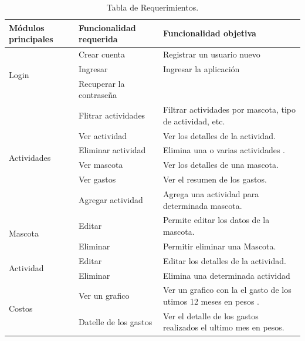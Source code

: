 \documentclass[letterpaper,12pt,openany,oneside]{book}
\begin{document}
\begin{table}[htb]
\begin{center}
\begin{tabular}{|l|l|p{5cm}|} 

\hline
Módulos principales & Funcionalidad
requerida & Funcionalidad objetiva \\
\hline \hline  \hline 
\multirow{3}{2cm}{Login} 
&Crear cuenta & Registrar un usuario nuevo \\ \cline{2-3}
&Ingresar  & Ingresar la aplicación\\ \cline{2-3}
&Recuperar la contraseña &  \\ \cline{1-3}

\multirow{6}{2cm}{Actividades} 
& Flitrar actividades& Filtrar actividades por mascota,  tipo de actividad, etc. \\ \cline{2-3}
&Ver actividad  & Ver los detalles de la actividad.\\ \cline{2-3}
&Eliminar actividad &  Elimina una o varias actividades . \\ \cline{2-3}
&Ver mascota  & Ver los detalles de una mascota.\\ \cline{2-3}
&Ver gastos  & Ver el resumen de los gastos.\\ \cline{2-3}
&Agregar actividad & Agrega una actividad para determinada mascota.  \\ \cline{1-3}

\multirow{2}{2cm}{Mascota} 
& Editar & Permite editar los datos de la mascota. \\ \cline{2-3}
& Eliminar  & Permitir eliminar una Mascota.\\ \cline{1-3}

\multirow{2}{2cm}{Actividad}
& Editar& Editar los detalles de la actividad. \\ \cline{2-3}
& Eliminar  & Elimina una determinada actividad \\ \cline{1-3}

\multirow{3}{2cm}{Costos}
 & Ver un grafico  & Ver un grafico con la el gasto de los utimos 12 meses en pesos .\\ \cline{2-3}
& Datelle de los gastos &Ver el detalle de los gastos realizados el ultimo mes en pesos.\\ \cline{1-3}

\end{tabular}
\caption{Tabla de Requerimientos.}
\label{tabla:Tabla de Requerimientos.}
\end{center}
\end{table}
\end{document}
